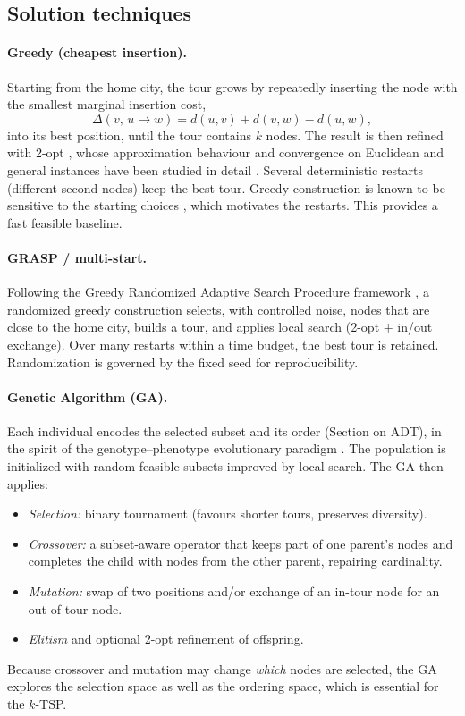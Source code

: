 \documentclass[conference]{IEEEtran}
\begin{document}
\subsection{Solution techniques}\label{sec:soltech}

\paragraph{Greedy (cheapest insertion).}
Starting from the home city, the tour grows by repeatedly inserting the node with the smallest marginal insertion cost,
\[
  \Delta(v,\,u\!\to\!w)=d(u,v)+d(v,w)-d(u,w),
\]
into its best position, until the tour contains $k$ nodes. The result is then refined with 2-opt \cite{croes1958}, whose approximation behaviour and convergence on Euclidean and general instances have been studied in detail \cite{brodowsky2023kopt,heimann2025kopt}. Several deterministic restarts (different second nodes) keep the best tour. Greedy construction is known to be sensitive to the starting choices \cite{gutin2002greedy}, which motivates the restarts. This provides a fast feasible baseline.

\paragraph{GRASP / multi-start.}
Following the Greedy Randomized Adaptive Search Procedure framework \cite{feo1995grasp}, a randomized greedy construction selects, with controlled noise, nodes that are close to the home city, builds a tour, and applies local search (2-opt $+$ in/out exchange). Over many restarts within a time budget, the best tour is retained. Randomization is governed by the fixed seed for reproducibility.

\paragraph{Genetic Algorithm (GA).}
Each individual encodes the selected subset and its order (Section on ADT), in the spirit of the genotype--phenotype evolutionary paradigm \cite{holland1975adaptation}. The population is initialized with random feasible subsets improved by local search. The GA then applies:
\begin{itemize}
  \item \emph{Selection:} binary tournament (favours shorter tours, preserves diversity).
  \item \emph{Crossover:} a subset-aware operator that keeps part of one parent's nodes and completes the child with nodes from the other parent, repairing cardinality.
  \item \emph{Mutation:} swap of two positions and/or exchange of an in-tour node for an out-of-tour node.
  \item \emph{Elitism} and optional 2-opt refinement of offspring.
\end{itemize}
Because crossover and mutation may change \emph{which} nodes are selected, the GA explores the selection space as well as the ordering space, which is essential for the $k$-TSP.
\end{document}
